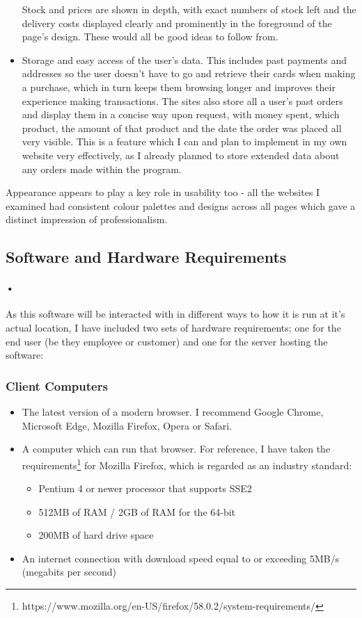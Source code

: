 ﻿\documentclass{article}
\begin{document}
\begin{itemize}
    Stock and prices are shown in depth, with exact numbers of stock left and the delivery costs displayed clearly and prominently in the foreground of the page's design.
    These would all be good ideas to follow from.
    \item Storage and easy access of the user's data.
    This includes past payments and addresses so the user doesn't have to go and retrieve their cards when making a purchase, which in turn keeps them browsing longer and improves their experience making transactions.
    The sites also store all a user's past orders and display them in a concise way upon request, with money spent, which product, the amount of that product and the date the order was placed all very visible.
    This is a feature which I can and plan to implement in my own website very effectively, as I already planned to store extended data about any orders made within the program.
    \end{itemize}
    Appearance appears to play a key role in usability too - all the websites I examined had consistent colour palettes and designs across all pages which gave a distinct impression of professionalism.
        
    \subsection{Software and Hardware Requirements}
    \paragraph{•}
    As this software will be interacted with in different ways to how it is run at it’s actual location, I have included two sets of hardware requirements; one for the end user (be they employee or customer) and one for the server hosting the software:
    
    \subsubsection{Client Computers}
    \begin{itemize}
    \item The latest version of a modern browser. 
    I recommend Google Chrome, Microsoft Edge, Mozilla Firefox, Opera or Safari.
    \item A computer which can run that browser. For reference, I have taken the requirements\footnote{https://www.mozilla.org/en-US/firefox/58.0.2/system-requirements/} for Mozilla Firefox, which is regarded as an industry standard:
    \begin{itemize}
    \item Pentium 4 or newer processor that supports SSE2
    \item 512MB of RAM / 2GB of RAM for the 64-bit 
    \item 200MB of hard drive space
    \end{itemize}
    \item An internet connection with download speed equal to or exceeding 5MB/s (megabits per second)
    \end{itemize}
    
\end{document}
